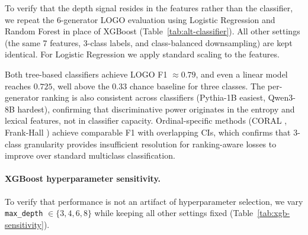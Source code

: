  To verify that the depth signal resides in the features rather than the classifier,
we repeat the 6-generator LOGO evaluation using Logistic Regression and Random Forest
in place of XGBoost (Table~\ref{tab:alt-classifier}).
All other settings (the same 7 features, 3-class labels, and class-balanced downsampling) are
kept identical. For Logistic Regression we apply standard scaling to the features.

\begin{table}[ht]
\centering
\caption{LOGO macro-F1 across three classifiers. Each column shows the held-out generator F1. (6-generator LOGO; 3-class.)}
\label{tab:alt-classifier}
\small
{}
\end{table}

 Both tree-based classifiers achieve LOGO F1 $\approx 0.79$,
and even a linear model reaches $0.725$, well above the $0.33$ chance baseline for
three classes.
The per-generator ranking is also consistent across classifiers
(Pythia-1B easiest, Qwen3-8B hardest),
confirming that discriminative power originates in the entropy and lexical features,
not in classifier capacity.
Ordinal-specific methods (CORAL \cite{coral_ordinal}, Frank-Hall \cite{frank_hall_ordinal}) achieve comparable F1 with overlapping CIs, which confirms that 3-class granularity provides insufficient resolution for ranking-aware losses to improve over standard multiclass classification.

\paragraph{XGBoost hyperparameter sensitivity.}
To verify that performance is not an artifact of hyperparameter selection, we vary \texttt{max\_depth} $\in \{3, 4, 6, 8\}$ while keeping all other settings fixed (Table~\ref{tab:xgb-sensitivity}).

